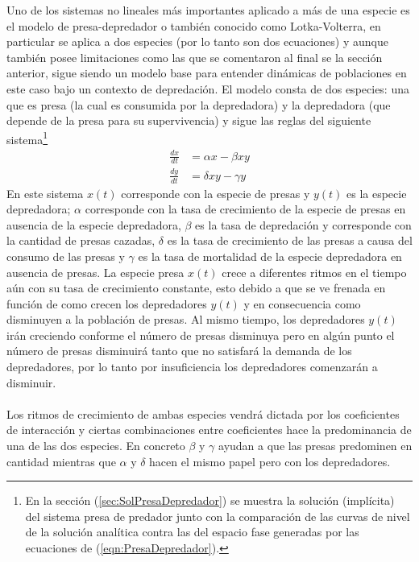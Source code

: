 Uno de los sistemas no lineales más importantes aplicado a más de una especie es el modelo de presa-depredador o también conocido como Lotka-Volterra, en particular se aplica a dos especies (por lo tanto son dos ecuaciones) y aunque también posee limitaciones como las que se comentaron al final se la sección anterior, sigue siendo un modelo base para entender dinámicas de poblaciones en este caso bajo un contexto de depredación. El modelo consta de dos especies: una que es presa (la cual es consumida por la depredadora) y la depredadora (que depende de la presa para su supervivencia) y sigue las reglas del siguiente sistema\footnote{En la sección (\ref{sec:SolPresaDepredador}) se muestra la solución (implícita) del sistema presa de predador junto con la comparación de las curvas de nivel de la solución analítica contra las del espacio fase generadas por las ecuaciones de (\ref{eqn:PresaDepredador}).}
\begin{equation}\label{eqn:PresaDepredador}
	\begin{split}
		\frac{dx}{dt} &= \alpha x - \beta xy\\
		\frac{dy}{dt} &= \delta xy -\gamma y
	\end{split}
\end{equation}
En este sistema $x(t)$ corresponde con la especie de presas y $y(t)$ es la especie depredadora; $\alpha$ corresponde con la tasa de crecimiento de la especie de presas en ausencia de la especie depredadora, $\beta$ es la tasa de depredación y corresponde con la cantidad de presas cazadas, $\delta$ es la tasa de crecimiento de las presas a causa del consumo de las presas y $\gamma$ es la tasa de mortalidad de la especie depredadora en ausencia de presas. La especie presa $x(t)$ crece a diferentes ritmos en el tiempo aún con su tasa de crecimiento constante, esto debido a que se ve frenada en función de como crecen los depredadores $y(t)$ y en consecuencia como disminuyen a la población de presas. Al mismo tiempo, los depredadores $y(t)$ irán creciendo conforme el número de presas disminuya pero en algún punto el número de presas disminuirá tanto que no satisfará la demanda de los depredadores, por lo tanto por insuficiencia los depredadores comenzarán a disminuir. \\
\\
Los ritmos de crecimiento de ambas especies vendrá dictada por los coeficientes de interacción y ciertas combinaciones entre coeficientes hace la predominancia de una de las dos especies. En concreto $\beta$ y $\gamma$ ayudan a que las presas predominen en cantidad mientras que $\alpha$ y $\delta$ hacen el mismo papel pero con los depredadores. 
